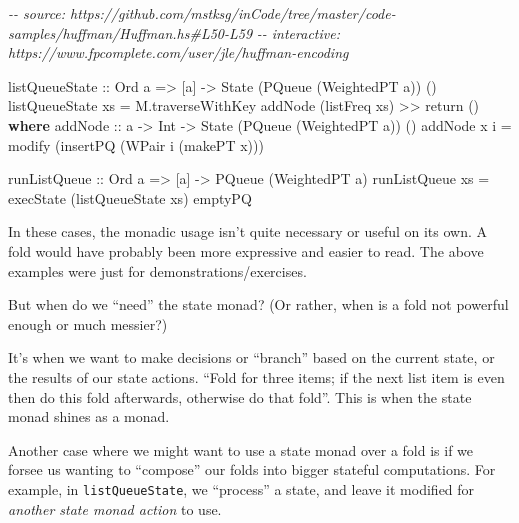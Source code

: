 \documentclass[]{article}
\newenvironment{Shaded}{}{}
\newcommand{\CommentTok}[1]{\textcolor[rgb]{0.38,0.63,0.69}{\textit{#1}}}
\newcommand{\DataTypeTok}[1]{\textcolor[rgb]{0.56,0.13,0.00}{#1}}
\newcommand{\FunctionTok}[1]{\textcolor[rgb]{0.02,0.16,0.49}{#1}}
\newcommand{\KeywordTok}[1]{\textcolor[rgb]{0.00,0.44,0.13}{\textbf{#1}}}
\newcommand{\NormalTok}[1]{#1}
\newcommand{\OperatorTok}[1]{\textcolor[rgb]{0.40,0.40,0.40}{#1}}
\newcommand{\OtherTok}[1]{\textcolor[rgb]{0.00,0.44,0.13}{#1}}
\begin{document}
\begin{Shaded}
\begin{Highlighting}[]
\CommentTok{{-}{-} source: https://github.com/mstksg/inCode/tree/master/code{-}samples/huffman/Huffman.hs\#L50{-}L59}
\CommentTok{{-}{-} interactive: https://www.fpcomplete.com/user/jle/huffman{-}encoding}

\OtherTok{listQueueState ::} \DataTypeTok{Ord}\NormalTok{ a }\OtherTok{=\textgreater{}}\NormalTok{ [a] }\OtherTok{{-}\textgreater{}} \DataTypeTok{State}\NormalTok{ (}\DataTypeTok{PQueue}\NormalTok{ (}\DataTypeTok{WeightedPT}\NormalTok{ a)) ()}
\NormalTok{listQueueState xs }\OtherTok{=}\NormalTok{ M.traverseWithKey addNode (listFreq xs) }\OperatorTok{\textgreater{}\textgreater{}} \FunctionTok{return}\NormalTok{ ()}
  \KeywordTok{where}
\OtherTok{    addNode ::}\NormalTok{ a }\OtherTok{{-}\textgreater{}} \DataTypeTok{Int} \OtherTok{{-}\textgreater{}} \DataTypeTok{State}\NormalTok{ (}\DataTypeTok{PQueue}\NormalTok{ (}\DataTypeTok{WeightedPT}\NormalTok{ a)) ()}
\NormalTok{    addNode x i }\OtherTok{=}\NormalTok{ modify (insertPQ (}\DataTypeTok{WPair}\NormalTok{ i (makePT x)))}

\OtherTok{runListQueue ::} \DataTypeTok{Ord}\NormalTok{ a }\OtherTok{=\textgreater{}}\NormalTok{ [a] }\OtherTok{{-}\textgreater{}} \DataTypeTok{PQueue}\NormalTok{ (}\DataTypeTok{WeightedPT}\NormalTok{ a)}
\NormalTok{runListQueue xs }\OtherTok{=}\NormalTok{ execState (listQueueState xs) emptyPQ}
\end{Highlighting}
\end{Shaded}

In these cases, the monadic usage isn't quite necessary or useful on its own. A
fold would have probably been more expressive and easier to read. The above
examples were just for demonstrations/exercises.

But when do we ``need'' the state monad? (Or rather, when is a fold not powerful
enough or much messier?)

It's when we want to make decisions or ``branch'' based on the current state, or
the results of our state actions. ``Fold for three items; if the next list item
is even then do this fold afterwards, otherwise do that fold''. This is when the
state monad shines as a monad.

Another case where we might want to use a state monad over a fold is if we
forsee us wanting to ``compose'' our folds into bigger stateful computations.
For example, in \texttt{listQueueState}, we ``process'' a state, and leave it
modified for \emph{another state monad action} to use.
\end{document}

